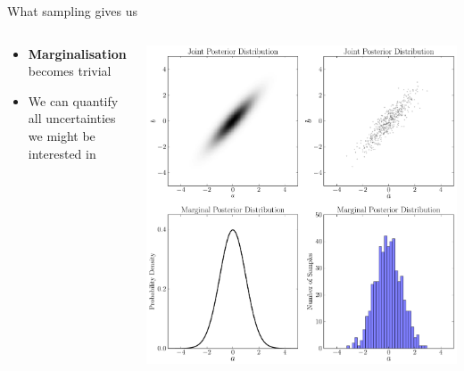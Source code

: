 \begin{frame}[t]{What sampling gives us}
\begin{columns}[T]
\begin{column}{0.35\textwidth}
  \vspace{30pt}
  \begin{itemize}
  \setlength{\itemsep}{20pt}
  \item {\bf Marginalisation} becomes trivial
  \item We can quantify all uncertainties we might be interested in
  \end{itemize}
\end{column}
\hfill
\begin{column}{0.5\textwidth}
  \hspace{-30pt}
  \includegraphics[scale=0.25]{marginalisation.pdf}
\end{column}

\end{columns}
\end{frame}

